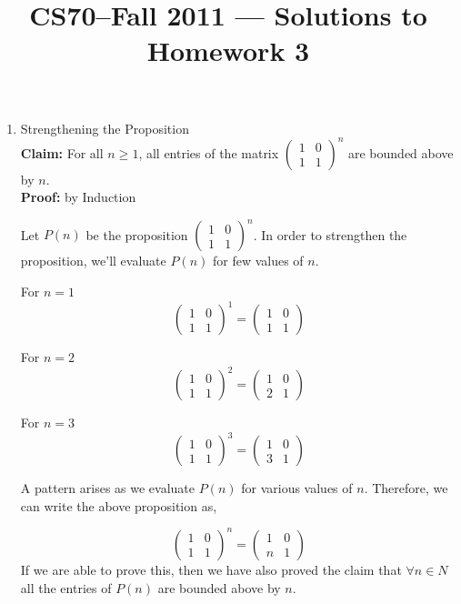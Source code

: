 \documentclass[11pt]{article}
\title{CS70--Fall 2011 --- Solutions to Homework 3}
\begin{document}
\maketitle
	
	\begin{enumerate}
		\item Strengthening the Proposition\\
		\textbf{Claim:} For all $n\geq 1$, all entries of the matrix $\left(\begin{array}{cc}1&0\\1&1\end{array}\right)^n$ are bounded above by $n$.\\
		\textbf{Proof:} by Induction
		
		Let $P(n)$ be the proposition $\left(\begin{array}{cc}1&0\\1&1\end{array}\right)^n$. In order to strengthen the proposition, we'll evaluate $P(n)$ for few values of $n$.
		
		For $n = 1$ 
		$$\left(\begin{array}{cc}1&0\\1&1\end{array}\right)^1 = \left(\begin{array}{cc}1&0\\1&1\end{array}\right)$$
		
		For $n = 2$ 
		$$\left(\begin{array}{cc}1&0\\1&1\end{array}\right)^2 = \left(\begin{array}{cc}1&0\\2&1\end{array}\right)$$		

		For $n = 3$ 
		$$\left(\begin{array}{cc}1&0\\1&1\end{array}\right)^3 = \left(\begin{array}{cc}1&0\\3&1\end{array}\right)$$		
		
		A pattern arises as we evaluate $P(n)$ for various values of $n$. Therefore, we can write the above proposition as, 
		
		$$\left(\begin{array}{cc}1&0\\1&1\end{array}\right)^n = \left(\begin{array}{cc}1&0\\n&1\end{array}\right)$$				
		If we are able to prove this, then we have also proved the claim that $\forall n \in N$ all the entries of $P(n)$ are bounded above by $n$.
		

\end{enumerate}
\end{document}
